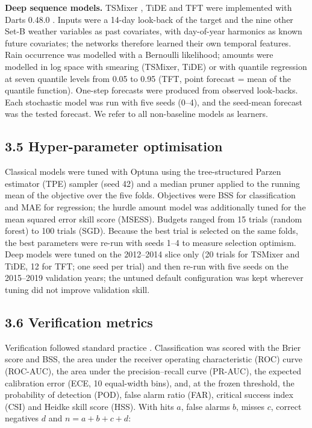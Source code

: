 \documentclass[
]{article}
\begin{document}
\textbf{Deep sequence models.} TSMixer \citep{chen2023tsmixer}, TiDE \citep{das2023tide} and TFT \citep{lim2021} were implemented with Darts 0.48.0 \citep{herzen2022}. Inputs were a 14-day look-back of the target and the nine other Set-B weather variables as past covariates, with day-of-year harmonics as known future covariates; the networks therefore learned their own temporal features. Rain occurrence was modelled with a Bernoulli likelihood; amounts were modelled in log space with smearing (TSMixer, TiDE) or with quantile regression at seven quantile levels from 0.05 to 0.95 (TFT, point forecast = mean of the quantile function). One-step forecasts were produced from observed look-backs. Each stochastic model was run with five seeds (0--4), and the seed-mean forecast was the tested forecast. We refer to all non-baseline models as learners.

\hypertarget{hyper-parameter-optimisation}{%
\subsection{3.5 Hyper-parameter optimisation}\label{hyper-parameter-optimisation}}

Classical models were tuned with Optuna \citep{akiba2019} using the tree-structured Parzen estimator (TPE) sampler (seed 42) and a median pruner applied to the running mean of the objective over the five folds. Objectives were BSS for classification and MAE for regression; the hurdle amount model was additionally tuned for the mean squared error skill score (MSESS). Budgets ranged from 15 trials (random forest) to 100 trials (SGD).  %
Because the best trial is selected on the same folds, the best parameters were re-run with seeds 1--4 to measure selection optimism. Deep models were tuned on the 2012--2014 slice only (20 trials for TSMixer and TiDE, 12 for TFT; one seed per trial) and then re-run with five seeds on the 2015--2019 validation years; the untuned default configuration was kept wherever tuning did not improve validation skill.

\hypertarget{verification-metrics}{%
\subsection{3.6 Verification metrics}\label{verification-metrics}}

Verification followed standard practice \citep{wilks2019}. Classification was scored with the Brier score and BSS, the area under the receiver operating characteristic (ROC) curve (ROC-AUC), the area under the precision--recall curve (PR-AUC), the expected calibration error (ECE, 10 equal-width bins), and, at the frozen threshold, the probability of detection (POD), false alarm ratio (FAR), critical success index (CSI) and Heidke skill score (HSS). With hits \(a\), false alarms \(b\), misses \(c\), correct negatives \(d\) and \(n = a+b+c+d\):
\end{document}
